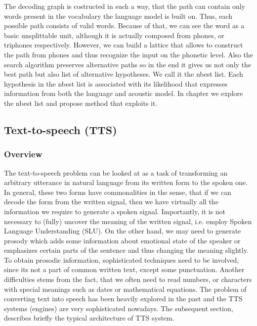 The decoding graph is costructed in such a way, that the path can contain only words present in the vocabulary the language model is built on.
Thus, each possible path consists of valid words.
Because of that, we can see the word as a basic unsplittable unit, although it is actually composed from phones, or triphones respectively.
However, we can build a lattice that allows to construct the path from phones and thus recognize the input on the phonetic level.
Also the search algorithm preserves alternative paths so in the end it gives us not only the best path but also list of alternative hypotheses.
We call it the nbest list.
Each hypothesis in the nbest list is associated with its likelihood that expresses information from both the language and acoustic model.
In chapter  we explore the nbest list and propose method that exploits it.
\subsection{Text-to-speech (TTS)}
\subsubsection*{Overview\cite{taylor2009text}}
The text-to-speech problem can be looked at as a task of transforming an arbitrary utterance in natural language from its written form to the spoken one.
In general, these two forms have commonalities in the sense, that if we can decode the form from the written signal, then we have virtually all the information we require to generate a spoken signal.
Importantly, it is not necessary to (fully) uncover the meaning of the written signal, i.e. employ Spoken Language Understanding (SLU).
On the other hand, we may need to generate prosody which adds some information about emotional state of the speaker or emphasizes certain parts of the sentence and thus changing the meaning slightly.
To obtain prosodic information, sophisticated techniques need to be involved, since its not a part of common written text, except some punctuation.
Another difficulties stems from the fact, that we often need to read numbers, or characters with special meanings such as dates or mathematical equations.
The problem of converting text into speech has been heavily explored in the past and the TTS systems (engines) are very sophisticated nowadays.
The subsequent section, describes briefly the typical architecture of TTS system.
